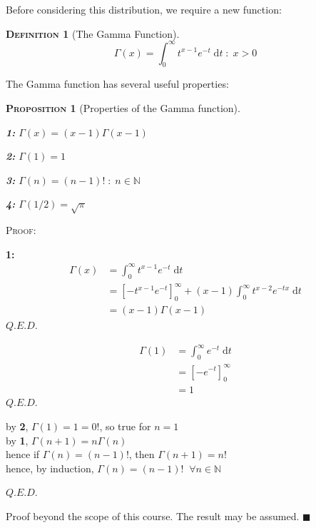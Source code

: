 \documentclass[12pt,a4paper]{article}
\newtheorem{definition}{\textsc{Definition}}[section]
\newtheorem{proposition}{\textsc{Proposition}}[section]
\begin{document}
Before considering this distribution, we require a new function:

\begin{definition}[The Gamma Function]
$$\Gamma(x) = \int_0^{\infty}\!\!t^{x-1}e^{-t}\;\mathrm{d}t \; : \; x>0$$
\end{definition}

\noindent The Gamma function has several useful properties:

\begin{proposition}[Properties of the Gamma function]$\quad$\par
{\bf 1:}  $\Gamma(x) = (x-1)\Gamma(x-1)$\par
{\bf 2:} $\Gamma(1) = 1$\par
{\bf 3:} $\Gamma(n) = (n-1)! \; : \; n \in \mathbb{N}$\par
{\bf 4:} $\Gamma(1/2) = \sqrt \pi$\par
\end{proposition}

\noindent\textsc{Proof:}\par
{\bf 1:}
\begin{align*}
\Gamma(x) &= \int_0^\infty \!\! t^{x-1}e^{-t}\;\mathrm{d}t\\
&=\left[ -t^{x-1}e^{-t}\right]_0^\infty + (x-1)\int_0^\infty\!\! t^{x-2}e^{-tx}\;\mathrm{d}t\\
&= (x-1)\Gamma(x-1)
\end{align*}
\hfill$Q.E.D.$

\begin{align*}
\Gamma(1) &= \int_0^\infty \!\! e^{-t}\;\mathrm{d}t\\
&= \left[-e^{-t}\right]_0^\infty\\
&= 1
\end{align*}
\hfill$Q.E.D.$

\begin{center}
by {\bf 2}, $\Gamma(1) = 1 = 0!$, so true for $n=1$\\
by {\bf 1}, $\Gamma(n+1) = n\Gamma(n)$\\
hence if $\Gamma(n)=(n-1)!$, then $\Gamma(n+1) = n!$\\
hence, by induction, $\Gamma(n) = (n-1)! \;\; \forall n \in \mathbb{N}$
\end{center}
\hfill$Q.E.D.$

\par
\indent Proof beyond the scope of this course. The result may be assumed.
\hfill $\blacksquare$\par
\vspace{1cm}
\end{document}
